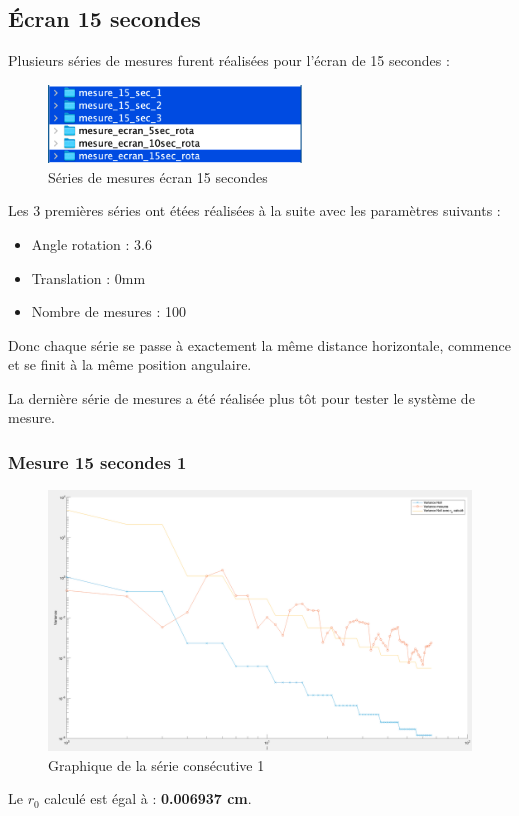 \subsection{Écran 15 secondes}
Plusieurs séries de mesures furent réalisées pour l'écran de 15 secondes :
\begin{figure}[H]
    \centering
    \includegraphics[width = 0.6\textwidth]{assets/figures/mesures/series_mesures_15sec.png}
    \caption{Séries de mesures écran 15 secondes}
\end{figure}
Les 3 premières séries ont étées réalisées à la suite avec les paramètres suivants :
\begin{itemize}
    \item Angle rotation : 3.6\textdegree
    \item Translation : 0mm
    \item Nombre de mesures : 100
\end{itemize}
Donc chaque série se passe à exactement la même distance horizontale, commence et se finit à la même position angulaire.

La dernière série de mesures a été réalisée plus tôt pour tester le système de mesure.

\subsubsection{Mesure 15 secondes 1}
\begin{figure}[H]
    \centering
    \includegraphics[width = \textwidth]{assets/figures/mesures/mesure_15_sec_1_plot.png}
    \caption{Graphique de la série consécutive 1}
\end{figure}
Le \textbf{$r_0$} calculé est égal à : \textbf{0.006937 cm}.

